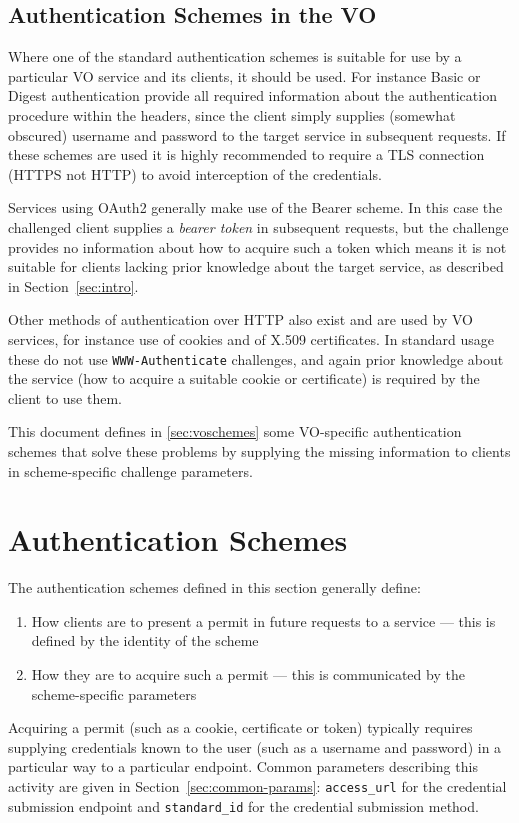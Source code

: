 \documentclass[11pt,a4paper]{ivoa}
\newcommand{\header}[1]{{\tt #1}}
\begin{document}
\subsection{Authentication Schemes in the VO}

Where one of the standard authentication schemes is
suitable for use by a particular VO service and its clients,
it should be used.
For instance Basic or Digest authentication provide all required
information about the authentication procedure within the headers,
since the client simply supplies
(somewhat obscured) username and password
to the target service in subsequent requests.
If these schemes are used it is highly recommended
to require a TLS connection (HTTPS not HTTP) to avoid interception of
the credentials.

Services using OAuth2 generally make use of the Bearer scheme.
In this case the challenged client supplies a {\em bearer token}
in subsequent requests,
but the challenge provides no information about how to acquire
such a token which means it is not suitable for clients lacking
prior knowledge about the target service, as described in
Section~\ref{sec:intro}.

Other methods of authentication over HTTP also exist
and are used by VO services,
for instance use of cookies and of X.509 certificates.
In standard usage these do not use \header{WWW-Authenticate} challenges,
and again prior knowledge about the service
(how to acquire a suitable cookie or certificate)
is required by the client to use them.

This document defines in \ref{sec:voschemes}
some VO-specific authentication schemes
that solve these problems by supplying the missing information to
clients in scheme-specific challenge parameters.

\section{Authentication Schemes}\label{sec:authschemes}

The authentication schemes defined in this section
generally define:
\begin{enumerate}
  \item How clients are to present a permit in future requests
        to a service --- this is defined by the identity of the scheme
  \item How they are to acquire such a permit ---
        this is communicated by the scheme-specific parameters
\end{enumerate}
Acquiring a permit (such as a cookie, certificate or token)
typically requires supplying credentials known to the user 
(such as a username and password) in a particular way to a particular
endpoint.
Common parameters describing this activity are given in
Section~\ref{sec:common-params}:
\verb|access_url| for the credential submission endpoint and
\verb|standard_id| for the credential submission method.
\end{document}
